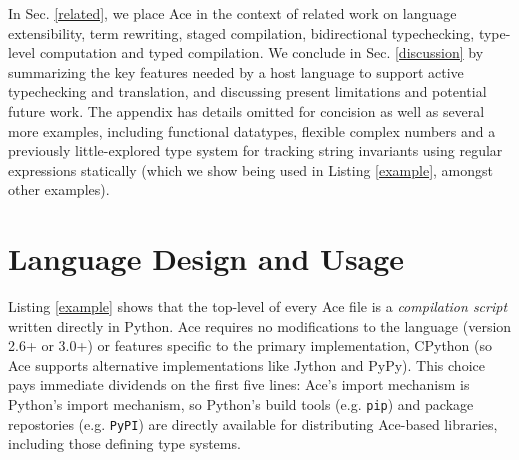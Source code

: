 \documentclass[10pt,preprint]{sigplanconf}
\begin{document}
In Sec.  \ref{related}, we place Ace in the context of related work on language extensibility, term rewriting, staged  compilation, bidirectional typechecking, type-level computation and typed compilation. We conclude in Sec. \ref{discussion} by summarizing the key features needed by a host language to support active typechecking and translation, and discussing present limitations and potential future work. The appendix has details omitted for concision as well as several more examples, including functional datatypes, flexible complex numbers and a previously little-explored type system for tracking string invariants using regular expressions statically (which we show being used in Listing \ref{example}, amongst  other examples). 

\section{Language Design and Usage}\label{usage}


%
Listing \ref{example} shows that the top-level of every Ace file is a \emph{compilation script} written directly in Python. Ace requires no modifications to the language (version 2.6+ or 3.0+) or features specific to the primary implementation, CPython (so Ace supports alternative implementations like Jython and PyPy). This choice pays immediate dividends on the first five lines: Ace's import mechanism is Python's import mechanism, so Python's build tools (e.g. \verb|pip|) and package repostories (e.g. \verb|PyPI|) are directly available for distributing Ace-based libraries, including those defining type systems. %

\end{document}
